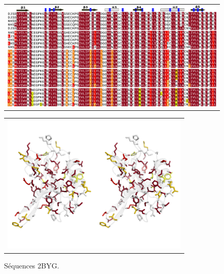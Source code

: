     \clearpage

\begin{landscape}

   \begin{figure}[t]
     \centering
     \begin{tabular}{c}
       \includegraphics[width=14cm]{boost_hydro/align2BYG.png} \\
     \end{tabular}
\label{result:PDZ_seed}
   \end{figure}

   \begin{figure}[t]
     \centering
     \begin{tabular}{c}
       \includegraphics[width=9cm]{boost_hydro/structure2BYG.png} \\
     \end{tabular}

     \caption{\small Séquences 2BYG.}

\label{result:PDZ_seed}
   \end{figure}

\end{landscape}


